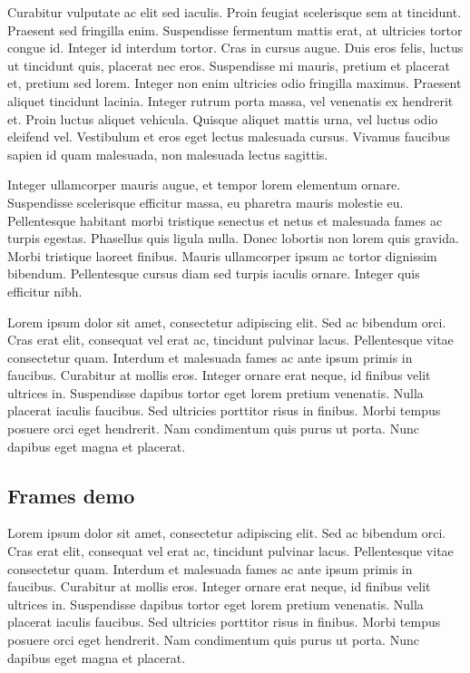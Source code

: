 \documentclass[11pt, a4paper]{report}
\begin{document}
\par Curabitur vulputate ac elit sed iaculis. Proin feugiat scelerisque sem at tincidunt. Praesent sed fringilla enim. Suspendisse fermentum mattis erat, at ultricies tortor congue id. Integer id interdum tortor. Cras in cursus augue. Duis eros felis, luctus ut tincidunt quis, placerat nec eros. Suspendisse mi mauris, pretium et placerat et, pretium sed lorem. Integer non enim ultricies odio fringilla maximus. Praesent aliquet tincidunt lacinia. Integer rutrum porta massa, vel venenatis ex hendrerit et. Proin luctus aliquet vehicula. Quisque aliquet mattis urna, vel luctus odio eleifend vel. Vestibulum et eros eget lectus malesuada cursus. Vivamus faucibus sapien id quam malesuada, non malesuada lectus sagittis. 

\par Integer ullamcorper mauris augue, et tempor lorem elementum ornare. Suspendisse scelerisque efficitur massa, eu pharetra mauris molestie eu. Pellentesque habitant morbi tristique senectus et netus et malesuada fames ac turpis egestas. Phasellus quis ligula nulla. Donec lobortis non lorem quis gravida. Morbi tristique laoreet finibus. Mauris ullamcorper ipsum ac tortor dignissim bibendum. Pellentesque cursus diam sed turpis iaculis ornare. Integer quis efficitur nibh.

\par Lorem ipsum dolor sit amet, consectetur adipiscing elit. Sed ac bibendum orci. Cras erat elit, consequat vel erat ac, tincidunt pulvinar lacus. Pellentesque vitae consectetur quam. Interdum et malesuada fames ac ante ipsum primis in faucibus. Curabitur at mollis eros. Integer ornare erat neque, id finibus velit ultrices in. Suspendisse dapibus tortor eget lorem pretium venenatis. Nulla placerat iaculis faucibus. Sed ultricies porttitor risus in finibus. Morbi tempus posuere orci eget hendrerit. Nam condimentum quis purus ut porta. Nunc dapibus eget magna et placerat.

\subsection{Frames demo}

\par Lorem ipsum dolor sit amet, consectetur adipiscing elit. Sed ac bibendum orci. Cras erat elit, consequat vel erat ac, tincidunt pulvinar lacus. Pellentesque vitae consectetur quam. Interdum et malesuada fames ac ante ipsum primis in faucibus. Curabitur at mollis eros. Integer ornare erat neque, id finibus velit ultrices in. Suspendisse dapibus tortor eget lorem pretium venenatis. Nulla placerat iaculis faucibus. Sed ultricies porttitor risus in finibus. Morbi tempus posuere orci eget hendrerit. Nam condimentum quis purus ut porta. Nunc dapibus eget magna et placerat.
\end{document}
